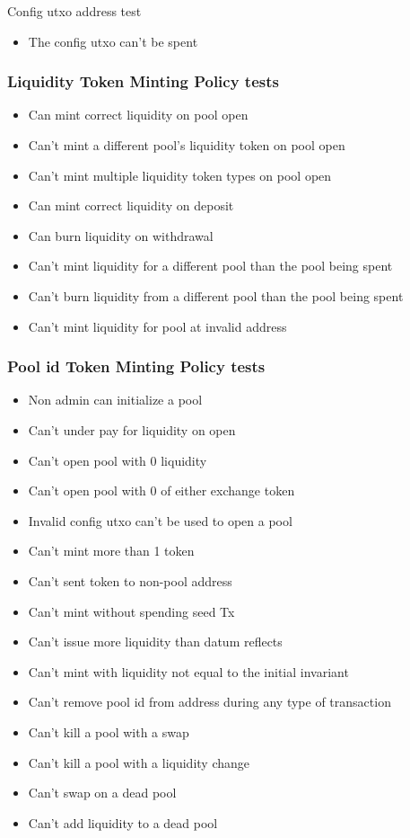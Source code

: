 \documentclass{article}
\begin{document}
Config utxo address test

\begin{itemize}
	\item The config utxo can't be spent
\end{itemize}

\subsubsection{Liquidity Token Minting Policy tests}

\begin{itemize}
	\item Can mint correct liquidity on pool open
	\item Can't mint a different pool's liquidity token on pool open
	\item Can't mint multiple liquidity token types on pool open
	\item Can mint correct liquidity on deposit
	\item Can burn liquidity on withdrawal
	\item Can't mint liquidity for a different pool than the pool being spent
	\item Can't burn liquidity from a different pool than the pool being spent
	\item Can't mint liquidity for pool at invalid address
\end{itemize}

\subsubsection{Pool id Token Minting Policy tests}

\begin{itemize}
	\item Non admin can initialize a pool
	\item Can't under pay for liquidity on open
	\item Can't open pool with 0 liquidity
	\item Can't open pool with 0 of either exchange token
	\item Invalid config utxo can't be used to open a pool
	\item Can't mint more than 1 token
	\item Can't sent token to non-pool address
	\item Can't mint without spending seed Tx
	\item Can't issue more liquidity than datum reflects
	\item Can't mint with liquidity not equal to the initial invariant
	\item Can't remove pool id from address during any type of transaction
	\item Can't kill a pool with a swap
	\item Can't kill a pool with a liquidity change
	\item Can't swap on a dead pool
	\item Can't add liquidity to a dead pool
\end{itemize}
\end{document}
